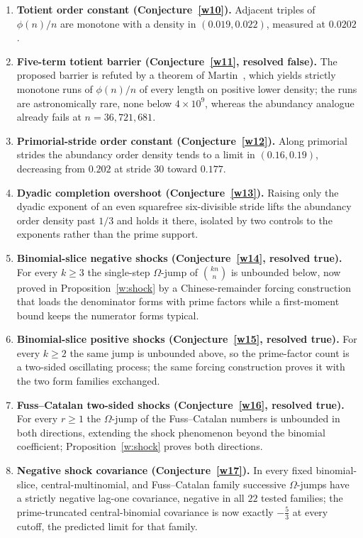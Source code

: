 \documentclass[11pt]{article}
\theoremstyle{definition}
\begin{document}
\begin{enumerate}
\item \textbf{Totient order constant (Conjecture~\ref{w10}).}  Adjacent triples of $\phi(n)/n$ are monotone with a density in $(0.019,0.022)$, measured at $0.0202$.
\item \textbf{Five-term totient barrier (Conjecture~\ref{w11}, resolved false).}  The proposed barrier is refuted by a theorem of Martin~\cite{Martin06}, which yields strictly monotone runs of $\phi(n)/n$ of every length on positive lower density; the runs are astronomically rare, none below $4\times10^9$, whereas the abundancy analogue already fails at $n=36{,}721{,}681$.
\item \textbf{Primorial-stride order constant (Conjecture~\ref{w12}).}  Along primorial strides the abundancy order density tends to a limit in $(0.16,0.19)$, decreasing from $0.202$ at stride $30$ toward $0.177$.
\item \textbf{Dyadic completion overshoot (Conjecture~\ref{w13}).}  Raising only the dyadic exponent of an even squarefree six-divisible stride lifts the abundancy order density past $1/3$ and holds it there, isolated by two controls to the exponents rather than the prime support.
\item \textbf{Binomial-slice negative shocks (Conjecture~\ref{w14}, resolved true).}  For every $k\ge3$ the single-step $\Omega$-jump of $\binom{kn}{n}$ is unbounded below, now proved in Proposition~\ref{w:shock} by a Chinese-remainder forcing construction that loads the denominator forms with prime factors while a first-moment bound keeps the numerator forms typical.
\item \textbf{Binomial-slice positive shocks (Conjecture~\ref{w15}, resolved true).}  For every $k\ge2$ the same jump is unbounded above, so the prime-factor count is a two-sided oscillating process; the same forcing construction proves it with the two form families exchanged.
\item \textbf{Fuss--Catalan two-sided shocks (Conjecture~\ref{w16}, resolved true).}  For every $r\ge1$ the $\Omega$-jump of the Fuss--Catalan numbers is unbounded in both directions, extending the shock phenomenon beyond the binomial coefficient; Proposition~\ref{w:shock} proves both directions.
\item \textbf{Negative shock covariance (Conjecture~\ref{w17}).}  In every fixed binomial-slice, central-multinomial, and Fuss--Catalan family successive $\Omega$-jumps have a strictly negative lag-one covariance, negative in all $22$ tested families; the prime-truncated central-binomial covariance is now exactly $-\tfrac53$ at every cutoff, the predicted limit for that family.

\end{enumerate}
\end{document}
